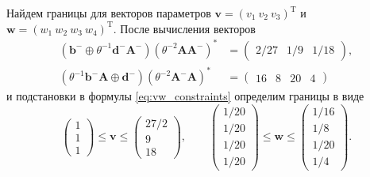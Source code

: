 \documentclass[specialist,
               substylefile = spbu.rtx,
               subf,href,colorlinks=true, 12pt]{disser}
\DeclareMathOperator{\T}{T}
\theoremstyle{definition}
\begin{document}
Найдем границы для векторов параметров $\bm{v}=(v_{1}~v_{2}~v_{3})^{\T}$ и $\bm{w}=(w_{1}~w_{2}~w_{3}~w_{4})^{\T}$. После вычисления векторов
\begin{align*}
(\bm{b}^{-}\oplus\theta^{-1}\bm{d}^{-}\bm{A}^{-})(\theta^{-2}\bm{A}\bm{A}^{-})^{\ast}
&=
\begin{pmatrix}
 2/27 & 1/9 & 1/18
\end{pmatrix},
\\
(\theta^{-1}\bm{b}^{-}\bm{A}\oplus\bm{d}^{-})(\theta^{-2}\bm{A}^{-}\bm{A})^{\ast}
&=
\begin{pmatrix}
 16 & 8 & 20 & 4
\end{pmatrix}
\end{align*}
и подстановки в формулы \eqref{eq:vw_constraints} определим границы в виде
\begin{equation*}
\begin{pmatrix}
 1
\\
 1
\\
 1
\end{pmatrix} 
\leq
\bm{v}
\leq
\begin{pmatrix}
 27/2
\\
 9
\\
 18
\end{pmatrix},
\qquad
\begin{pmatrix}
 1/20
\\
 1/20
\\
 1/20
\\
 1/20
\end{pmatrix} 
\leq
\bm{w}
\leq
\begin{pmatrix}
 1/16
\\
 1/8
\\
 1/20
\\
 1/4
\end{pmatrix}.
\end{equation*}
\end{document}
